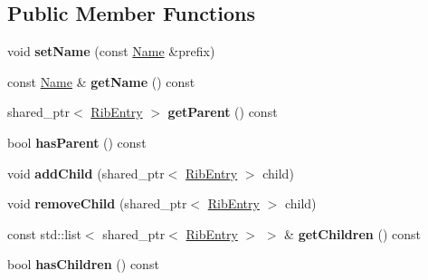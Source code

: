 \subsection*{Public Member Functions}
\begin{DoxyCompactItemize}
\item 
void {\bfseries set\+Name} (const \hyperlink{classndn_1_1Name}{Name} \&prefix)\hypertarget{classnfd_1_1rib_1_1RibEntry_ad2097ce5f2624a786c3e0cc93d3d5190}{}\label{classnfd_1_1rib_1_1RibEntry_ad2097ce5f2624a786c3e0cc93d3d5190}

\item 
const \hyperlink{classndn_1_1Name}{Name} \& {\bfseries get\+Name} () const\hypertarget{classnfd_1_1rib_1_1RibEntry_a80b19ad3f4d3fed0579a400a741875f3}{}\label{classnfd_1_1rib_1_1RibEntry_a80b19ad3f4d3fed0579a400a741875f3}

\item 
shared\+\_\+ptr$<$ \hyperlink{classnfd_1_1rib_1_1RibEntry}{Rib\+Entry} $>$ {\bfseries get\+Parent} () const\hypertarget{classnfd_1_1rib_1_1RibEntry_a2b75e8fed9d754db8f506258457da0ac}{}\label{classnfd_1_1rib_1_1RibEntry_a2b75e8fed9d754db8f506258457da0ac}

\item 
bool {\bfseries has\+Parent} () const\hypertarget{classnfd_1_1rib_1_1RibEntry_a903a3732fffe83669e103d2dd1492758}{}\label{classnfd_1_1rib_1_1RibEntry_a903a3732fffe83669e103d2dd1492758}

\item 
void {\bfseries add\+Child} (shared\+\_\+ptr$<$ \hyperlink{classnfd_1_1rib_1_1RibEntry}{Rib\+Entry} $>$ child)\hypertarget{classnfd_1_1rib_1_1RibEntry_aa97ca7a3cdf7e0b385d1fc7e68990495}{}\label{classnfd_1_1rib_1_1RibEntry_aa97ca7a3cdf7e0b385d1fc7e68990495}

\item 
void {\bfseries remove\+Child} (shared\+\_\+ptr$<$ \hyperlink{classnfd_1_1rib_1_1RibEntry}{Rib\+Entry} $>$ child)\hypertarget{classnfd_1_1rib_1_1RibEntry_ab7cfe352932611e58690d26bfa4d2c5c}{}\label{classnfd_1_1rib_1_1RibEntry_ab7cfe352932611e58690d26bfa4d2c5c}

\item 
const std\+::list$<$ shared\+\_\+ptr$<$ \hyperlink{classnfd_1_1rib_1_1RibEntry}{Rib\+Entry} $>$ $>$ \& {\bfseries get\+Children} () const\hypertarget{classnfd_1_1rib_1_1RibEntry_a85f52774be9360b7a6352847c249ef22}{}\label{classnfd_1_1rib_1_1RibEntry_a85f52774be9360b7a6352847c249ef22}

\item 
bool {\bfseries has\+Children} () const\hypertarget{classnfd_1_1rib_1_1RibEntry_aa352e8ed67c6f72b9a7b5fdef8de9a5f}{}\label{classnfd_1_1rib_1_1RibEntry_aa352e8ed67c6f72b9a7b5fdef8de9a5f}


\end{DoxyCompactItemize}
